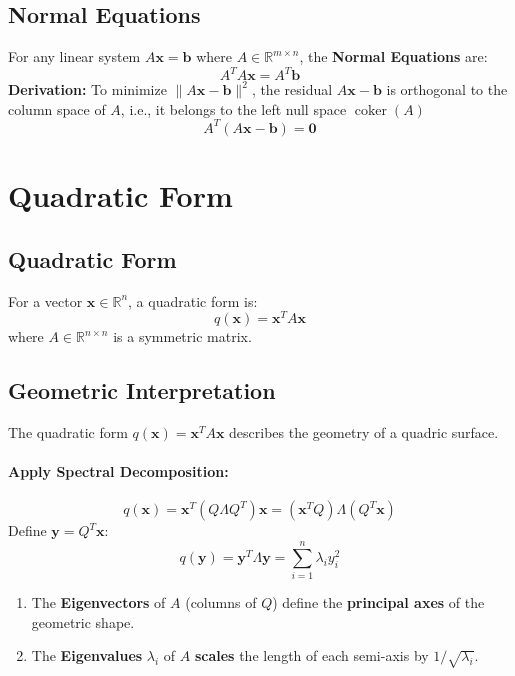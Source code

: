 \documentclass{article}
\begin{document}
\subsection{Normal Equations}

For any linear system $A\mathbf{x} = \mathbf{b}$ where $A \in \mathbb{R}^{m \times n}$, the \textbf{Normal Equations} are:
\[
    A^T A \mathbf{x} = A^T \mathbf{b}
\]
\textbf{Derivation:} To minimize $\|A\mathbf{x} - \mathbf{b}\|^2$, the residual $A\mathbf{x} - \mathbf{b}$ is orthogonal to the column space of $A$, i.e., it belongs to the left null space $\operatorname{coker}(A)$
\[
    A^T(A\mathbf{x} - \mathbf{b}) = \mathbf{0}
\]


\newpage
\section{Quadratic Form}

\subsection{Quadratic Form}
For a vector $\mathbf{x} \in \mathbb{R}^n$, a quadratic form is:
\[
    q(\mathbf{x}) = \mathbf{x}^T A \mathbf{x}
\]
where $A \in \mathbb{R}^{n \times n}$ is a symmetric matrix.

\subsection{Geometric Interpretation}
The quadratic form $q(\mathbf{x}) = \mathbf{x}^T A \mathbf{x}$ describes the geometry of a quadric surface.

\paragraph{Apply Spectral Decomposition:}
\[
    q(\mathbf{x}) = \mathbf{x}^T (Q \Lambda Q^T) \mathbf{x} = (\mathbf{x}^T Q) \Lambda (Q^T \mathbf{x})
\]
Define $\mathbf{y} = Q^T \mathbf{x}$:
\[
    q(\mathbf{y}) = \mathbf{y}^T \Lambda \mathbf{y} = \sum_{i=1}^n \lambda_i y_i^2
\]
\begin{enumerate}
    \item The \textbf{Eigenvectors} of $A$ (columns of $Q$) define the \textbf{principal axes} of the geometric shape.
    \item The \textbf{Eigenvalues} $\lambda_i$ of $A$ \textbf{scales} the length of each semi-axis by $1/\sqrt{\lambda_i}$.
\end{enumerate}
\end{document}
